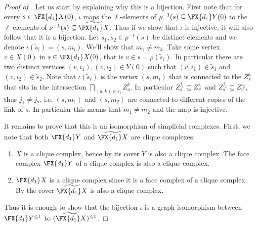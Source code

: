\begin{proof}[Proof of ]
    Let us start by explaining why this is a bijection. First note that for every \(s \in \FX{d_1}X(0)\), \(\iota\) maps the \(\ell\)-elements of \(\rho^{-1}(s) \subseteq \FX{d_1}Y(0)\) to the \(\ell\)-elements of \(\nu^{-1}(s) \subseteq \widetilde{\FX{d_1}X}\). Thus if we show that \(\iota\) is injective, it will also follow that it is a bijection. Let \(\tilde{s}_1, \tilde{s}_2 \in \rho^{-1}(s)\) be distinct elements and we denote \(\iota(\tilde{s}_i)=(s,m_i)\). We'll show that \(m_1 \ne m_2\). Take some vertex \(v \in X(0)\) in \(s \in \FX{d_1}X(0)\), that is \(v \in s=\rho(\tilde{s}_i)\). In particular there are two distinct vertices \((v,i_1),(v,i_2) \in Y(0)\) such that \((v,i_1) \in \tilde{s}_1\) and \((v,i_2) \in \tilde{s}_2\). Note that \(\iota(\tilde{s}_i)\) is the vertex \((s,m_i)\) that is connected to the \(Z_s^{j_i}\) that sits in the intersection \(\bigcap_{(u,k) \in \tilde{s}_i} Z_u^k\). In particular \(Z_s^{j_1} \subseteq Z_v^{i_1}\) and \(Z_s^{j_2} \subseteq Z_v^{i_2}\), thus \(j_1 \ne j_2\), i.e. \((s,m_1)\) and \((s,m_2)\) are connected to different copies of the link of \(s\). In particular this means that \(m_1 \ne m_2\) and the map is injective.
    
    It remains to prove that this is an isomorphism of simplicial complexes. First, we note that both \(\FX{d_1}Y\) and \(\widetilde{\FX{d_1}X}\) are clique complexes:
    \begin{enumerate}
        \item \(X\) is a clique complex, hence by  its cover \(Y\) is also a clique complex. The face complex \(\FX{d_1}Y\) of a clique complex is also a clique complex.
        \item \(\FX{d_1}X\) is a clique complex since it is a face complex of a clique complex. By  the cover \(\widetilde{\FX{d_1}X}\) is also a clique complex.
    \end{enumerate}
    Thus it is enough to show that the bijection \(\iota\) is a graph isomorphism between \(\FX{d_1}Y^{\leq 1}\) to \((\widetilde{\FX{d_1}X})^{\leq 1}\).
    

\end{proof}
